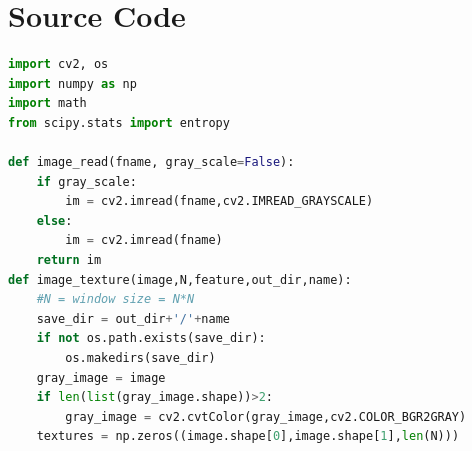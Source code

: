 \documentclass{article}
\begin{document}
\section{Source Code}
\begin{lstlisting}[language=Python]
import cv2, os
import numpy as np
import math
from scipy.stats import entropy

def image_read(fname, gray_scale=False):
	if gray_scale:
		im = cv2.imread(fname,cv2.IMREAD_GRAYSCALE)
	else:
		im = cv2.imread(fname)
	return im
def image_texture(image,N,feature,out_dir,name):
	#N = window size = N*N
	save_dir = out_dir+'/'+name
	if not os.path.exists(save_dir):
		os.makedirs(save_dir)
	gray_image = image
	if len(list(gray_image.shape))>2:
		gray_image = cv2.cvtColor(gray_image,cv2.COLOR_BGR2GRAY)
	textures = np.zeros((image.shape[0],image.shape[1],len(N)))


\end{lstlisting}
\end{document}
